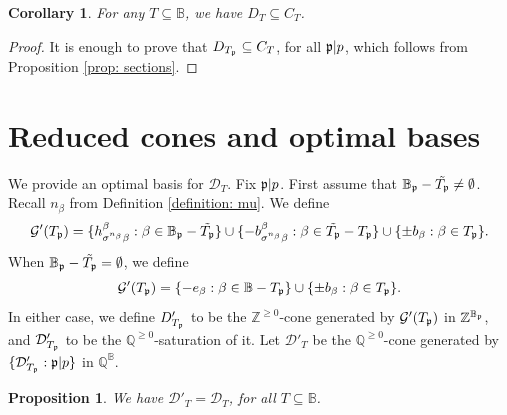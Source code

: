 \documentclass[11pt,pdflatex]{amsart}
\theoremstyle{plain}
\theoremstyle{definition}
\newcommand{\QQ}{\mathbf{Q}}
\newcommand{\ZZ}{\mathbf{Z}}
\theoremstyle{plain}
\newtheorem{prop}[theorem]{Proposition}
\newtheorem{cor}[theorem]{Corollary}
\theoremstyle{definition}
\theoremstyle{remark}
\numberwithin{equation}{section}
\numberwithin{figure}{section} \numberwithin{table}{subsection}
\newcommand{\gerp}{{\frak{p}}}
\newcommand{\calD}{{\mathcal{D}}}
\newcommand{\calG}{{\mathcal{G}}}
\def\BB{\mathbb{B}}
\def\QQ{\mathbb{Q}}
\def\ZZ{\mathbb{Z}}
\begin{document}
\begin{cor}\label{cor: lower bound} For any $T \subseteq \BB$, we have $D_T \subseteq C_T$.
\end{cor}
\begin{proof} It is enough to prove that $D_{T_\gerp} \subseteq C_{T}$, for all $\gerp|p$, which follows from Proposition \ref{prop: sections}.
\end{proof}


\section{ Reduced cones and optimal bases}\label{section: optimal}

We  provide an optimal basis for $\calD_{T}$. Fix $\gerp|p$. First assume that $\BB_\gerp-\tilde{T_\gerp}\neq \emptyset$. Recall $n_\beta$ from Definition \ref{definition: mu}. We define 
\begin{eqnarray*}\calG'(T_\gerp) = \{h_{\sigma^{n_\beta}\beta}^\beta: \beta \in \BB_\gerp-\tilde{T_\gerp} \} \cup \{-b_{\sigma^{n_\beta}\beta}^{\beta}: \beta \in \tilde{T_\gerp}-T_\gerp\}  \cup \{\pm b_\beta: \beta \in T_\gerp\}.\end{eqnarray*}
When  $\BB_\gerp-\tilde{T_\gerp}=\emptyset$,  we define
$$\calG'(T_\gerp)= \{-e_{\beta}: \beta \in \BB-T_\gerp\}  \cup \{\pm b_\beta: \beta \in T_\gerp\}.$$
In either case, we define $D'_{T_\gerp}$ to be the $\ZZ^{\geq 0}$-cone generated by $\calG'(T_\gerp)$ in $\ZZ^{\BB_\gerp}$, and $\calD'_{T_\gerp}$ to be the $\QQ^{\geq 0}$-saturation of it. Let $\calD'_{T}$ be the $\QQ^{\geq 0}$-cone generated by $\{\calD'_{T_\gerp}: \gerp|p\}$ in $\QQ^\BB$.

\begin{prop} \label{prop: optimal} We have $\calD'_{T}=\calD_{T}$, for all $T \subseteq  \BB$.
\end{prop}
\end{document}
